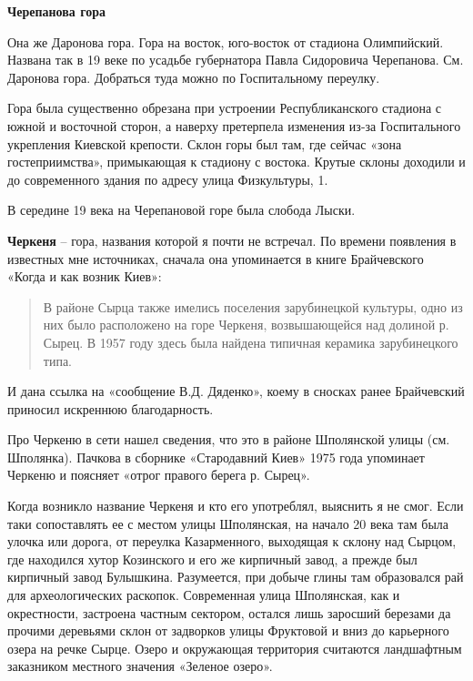 \medskip

\textbf{Черепанова гора}

Она же Даронова гора. Гора на восток, юго-восток от стадиона Олимпийский. Названа так в 19 веке по усадьбе губернатора Павла Сидоровича Черепанова. См. Даронова гора. Добраться туда можно по Госпитальному переулку.

Гора была существенно обрезана при устроении Республиканского стадиона с южной и восточной сторон, а наверху претерпела изменения из-за Госпитального укрепления Киевской крепости. Склон горы был там, где сейчас «зона гостеприимства», примыкающая к стадиону с востока. Крутые склоны доходили и до современного здания по адресу улица Физкультуры, 1.

В середине 19 века на Черепановой горе была слобода Лыски.\\

\medskip

\textbf{Черкеня} – гора, названия которой я почти не встречал. По времени появления в известных мне источниках, сначала она упоминается в книге Брайчевского «Когда и как возник Киев»:

\begin{quotation}
В районе Сырца также имелись поселения зарубинецкой культуры, одно из них было расположено на горе Черкеня, возвышающейся над долиной р. Сырец. В 1957 году здесь была найдена типичная керамика зарубинецкого типа.
\end{quotation}

И дана ссылка на «сообщение В.Д. Дяденко», коему в сносках ранее Брайчевский приносил искреннюю благодарность.

Про Черкеню в сети нашел сведения, что это в районе Шполянской улицы (см. Шполянка). Пачкова в сборнике «Стародавний Киев» 1975 года упоминает Черкеню и поясняет «отрог правого берега р. Сырец».

Когда возникло название Черкеня и кто его употреблял, выяснить я не смог. Если таки сопоставлять ее с местом улицы Шполянская, на начало 20 века там была улочка или дорога, от переулка Казарменного, выходящая к склону над Сырцом, где находился хутор Козинского и его же кирпичный завод, а прежде был кирпичный завод Булышкина. Разумеется, при добыче глины там образовался рай для археологических раскопок. Современная улица Шполянская, как и окрестности, застроена частным сектором, остался лишь заросший березами да прочими деревьями склон от задворков улицы Фруктовой и вниз до карьерного озера на речке Сырце. Озеро и окружающая территория считаются ландшафтным заказником местного значения «Зеленое озеро».

